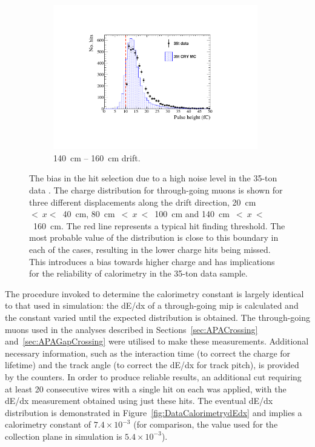 \begin{figure}
\begin{subfigure}[t]{0.32\linewidth}
    \includegraphics[width=0.98\textwidth]{HitReconstructionBias140-160.pdf}
    \caption{140~cm -- 160~cm drift.}
    \label{fig:DataCalorimetryThreshold3}
  \end{subfigure}
  \caption[The bias in the hit selection due to a high noise level in the 35-ton data.]{The bias in the hit selection due to a high noise level in the 35-ton data \cite{Brailsford2016}.  The charge distribution for through-going muons is shown for three different displacements along the drift direction, 20~cm~$<~x<$~40~cm, 80~cm~$<~x~<$~100~cm and 140~cm~$<~x~<$~160~cm.  The red line represents a typical hit finding threshold.  The most probable value of the distribution is close to this boundary in each of the cases, resulting in the lower charge hits being missed.  This introduces a bias towards higher charge and has implications for the reliability of calorimetry in the 35-ton data sample.}
  \label{fig:DataCalorimetryThreshold}
\end{figure}

The procedure invoked to determine the calorimetry constant is largely identical to that used in simulation: the dE/dx of a through-going mip is calculated and the constant varied until the expected distribution is obtained.  The through-going muons used in the analyses described in Sections~\ref{sec:APACrossing} and~\ref{sec:APAGapCrossing} were utilised to make these measurements.  Additional necessary information, such as the interaction time (to correct the charge for lifetime) and the track angle (to correct the dE/dx for track pitch), is provided by the counters.  In order to produce reliable results, an additional cut requiring at least 20 consecutive wires with a single hit on each was applied, with the dE/dx measurement obtained using just these hits.  The eventual dE/dx distribution is demonstrated in Figure~\ref{fig:DataCalorimetrydEdx} and implies a calorimetry constant of $7.4\times10^{-3}$ (for comparison, the value used for the collection plane in simulation is $5.4\times10^{-3}$).

